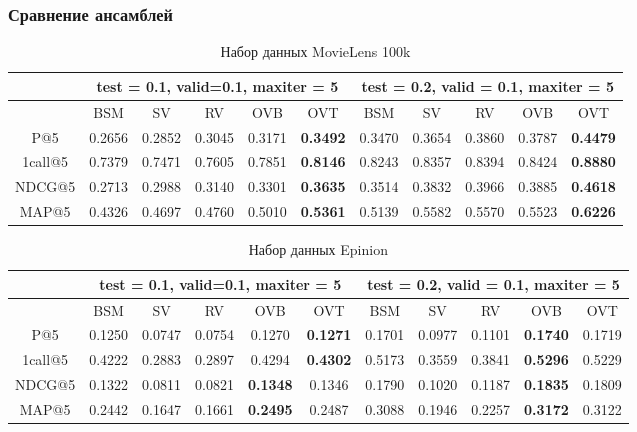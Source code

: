 \documentclass[a4paper,12pt]{article}
\begin{document}
\subsubsection*{Сравнение ансамблей}
\begin{table}[H]
\caption{Набор данных MovieLens 100k}
\label{tab:movm}
\begin{tabular}{|c|c|c|c|c|c|c|c|c|c|c|}
\hline
& \multicolumn{5}{|c|}{test = 0.1, valid=0.1, maxiter = 5} & \multicolumn{5}{|c|}{test = 0.2, valid = 0.1, maxiter = 5}\\
\hline
  & BSM  & SV &  RV & OVB & OVT &BSM  & SV & RV & OVB & OVT \\
\hline
P@5 &0.2656 & 0.2852 & 0.3045 & 0.3171 & \textbf{0.3492} & 0.3470 & 0.3654 &  0.3860 & 0.3787 & \textbf{0.4479} \\
\hline
1call@5 & 0.7379 & 0.7471 & 0.7605 & 0.7851 & \textbf{0.8146} & 0.8243 & 0.8357 & 0.8394 & 0.8424 & \textbf{0.8880} \\
\hline
NDCG@5 &0.2713 & 0.2988 & 0.3140 & 0.3301 & \textbf{0.3635}  & 0.3514 & 0.3832 & 0.3966 & 0.3885	& \textbf{0.4618}\\
\hline
MAP@5 & 0.4326 & 0.4697	& 0.4760 & 0.5010 & \textbf{0.5361} & 0.5139 & 0.5582 & 0.5570 & 0.5523 & \textbf{0.6226}\\
\hline
\end{tabular}
\end{table}


\begin{table}[H]
\caption{Набор данных Epinion}
\label{tab:movm}
\begin{tabular}{|c|c|c|c|c|c|c|c|c|c|c|}
\hline
& \multicolumn{5}{|c|}{test = 0.1, valid=0.1, maxiter = 5} & \multicolumn{5}{|c|}{test = 0.2, valid = 0.1, maxiter = 5}\\
\hline
  & BSM  & SV &  RV & OVB & OVT &BSM  & SV & RV & OVB & OVT \\
\hline
P@5 & 0.1250 & 0.0747 &  0.0754 & 0.1270 &	\textbf{0.1271} & 0.1701 &	0.0977	& 0.1101 &	\textbf{0.1740} & 0.1719 \\
\hline
1call@5 & 0.4222 & 0.2883 & 0.2897 & 0.4294 & \textbf{0.4302} & 0.5173 & 0.3559 & 0.3841 &	\textbf{0.5296} & 0.5229 \\
\hline
NDCG@5 &0.1322 & 0.0811 & 0.0821 &	\textbf{0.1348} & 0.1346 & 0.1790 &	0.1020 & 0.1187 & \textbf{0.1835} & 0.1809\\
\hline
MAP@5 & 0.2442 & 0.1647	& 0.1661 &	\textbf{0.2495} & 0.2487 &  0.3088 &	0.1946 & 0.2257 & \textbf{0.3172} & 0.3122\\
\hline
\end{tabular}
\end{table}
\end{document}
